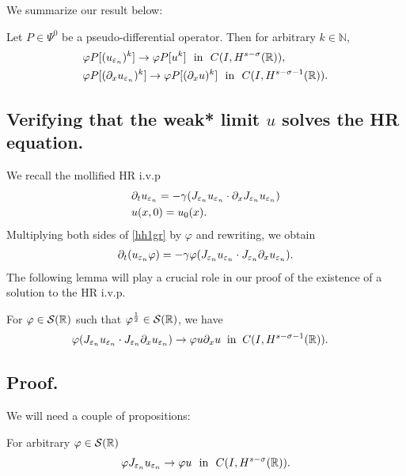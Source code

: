 We summarize our result below:
\begin{theorem}
\label{hhthm:crit1}
Let $P \in \Psi^0$ be a pseudo-differential operator. Then for
arbitrary $k \in \mathbb{N}$, 
\begin{equation}
\begin{split}
& \varphi P [(u_{\varepsilon_n})^k] \to \varphi P [u^k] \ \ \text{in}  \ \ C(I,
H^{s-\sigma }(\mathbb{R})),
\\
& 
\varphi P [(\partial_x u_{\varepsilon_n})^k] \to \varphi P [(\partial_x u)^k] \ \
\text{in}  \ \ C(I,
H^{s-\sigma -1}(\mathbb{R})).
\end{split}
\end{equation}
\end{theorem}
\subsection{Verifying that the weak* limit $u$ solves the HR equation.} 
We recall the mollified HR i.v.p
\begin{align}
& \partial_t u_{\varepsilon_n}  = -\gamma(J_{\varepsilon_n} u_{\varepsilon_n} \cdot \partial_x
J_{\varepsilon_n} u_{\varepsilon_n})
\label{hh1gr}
\\
& u(x,0) = u_0(x).
\label{hh2gr}
\end{align}
Multiplying both sides of \eqref{hh1gr} by $\varphi$ and rewriting,
we obtain
\begin{equation}
\label{hh3}
\begin{split}
\partial_t(u_{\varepsilon_n} \varphi) = -\gamma \varphi (J_{\varepsilon_n} u_{\varepsilon_n} \cdot
J_{\varepsilon_n} \partial_x u_{\varepsilon_n}).
\end{split}
\end{equation}
The following lemma will play a crucial role in our proof of the
existence of a solution to the HR i.v.p.
\begin{lemma}
\label{hhlem:cc}
For $\varphi \in \mathcal{S}(\mathbb{R})$ such that
$\varphi^\frac{1}{2} \in \mathcal{S}(\mathbb{R})$, we have
\begin{equation}
\begin{split}
\label{hhburgers_and_nonlocal_conv}
& \varphi (J_{\varepsilon_n} u_{\varepsilon_n} 
\cdot J_{\varepsilon_n}\partial_x u_{\varepsilon_n}) 
\to \varphi u \partial_x u \; \; 
\text{in} \; \;
C(I, H^{s-\sigma-1}(\mathbb{R})). 
\end{split}
\end{equation}
\end{lemma}
%
\subsection{Proof.} We will need a couple of propositions:
\begin{proposition}
For arbitrary $\varphi \in \mathcal{S}(\mathbb{R})$
\label{hhprop:1aa}
\begin{equation}
\begin{split}
\varphi J_{\varepsilon_n} u_{\varepsilon_n} \to \varphi u \ \ \text{in} \ \
C(I, H^{s-\sigma}(\mathbb{R})).
\label{hh}
\end{split}
\end{equation}
\end{proposition}
